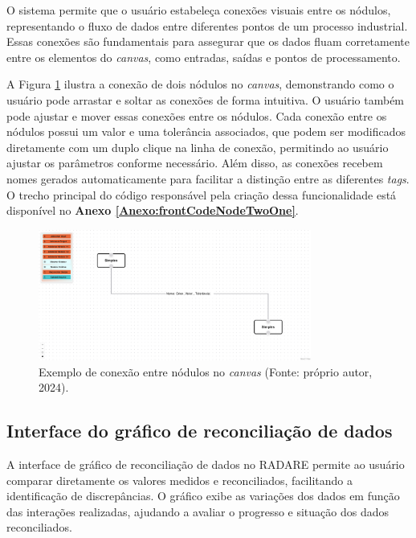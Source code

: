 O sistema permite que o usuário estabeleça conexões visuais entre os nódulos, representando o fluxo de dados entre diferentes pontos de um processo industrial. Essas conexões são fundamentais para assegurar que os dados fluam corretamente entre os elementos do \textit{canvas}, como entradas, saídas e pontos de processamento.

A Figura \ref{Fig:NodeConnections} ilustra a conexão de dois nódulos no \textit{canvas}, demonstrando como o usuário pode arrastar e soltar as conexões de forma intuitiva. O usuário também pode ajustar e mover essas conexões entre os nódulos. Cada conexão entre os nódulos possui um valor e uma tolerância associados, que podem ser modificados diretamente com um duplo clique na linha de conexão, permitindo ao usuário ajustar os parâmetros conforme necessário. Além disso, as conexões recebem nomes gerados automaticamente para facilitar a distinção entre as diferentes \textit{tags}. O trecho principal do código responsável pela criação dessa funcionalidade está disponível no \textbf{Anexo \ref{Anexo:frontCodeNodeTwoOne}}.

\begin{figure}[htbp]
    \centering
    \includegraphics[width=0.8\textwidth]{figuras/node-connection-example.png}
    \caption{Exemplo de conexão entre nódulos no \textit{canvas} (Fonte: próprio autor, 2024).}
    \label{Fig:NodeConnections}
\end{figure}

\subsection{Interface do gráfico de reconciliação de dados}

A interface de gráfico de reconciliação de dados no RADARE permite ao usuário comparar diretamente os valores medidos e reconciliados, facilitando a identificação de discrepâncias. O gráfico exibe as variações dos dados em função das interações realizadas, ajudando a avaliar o progresso e situação dos dados reconciliados.

